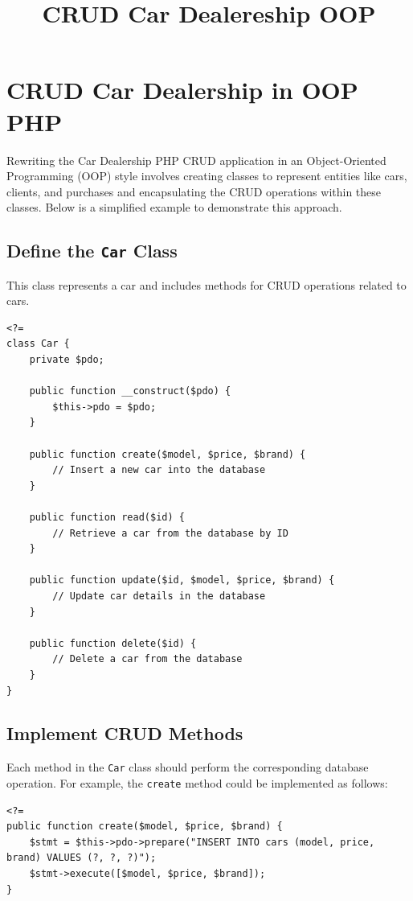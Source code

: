 \documentclass[11pt]{article}
\date{}
\title{CRUD Car Dealereship OOP}
\begin{document}
\maketitle
\setcounter{tocdepth}{3}
\tableofcontents

\setlength\parindent{10pt}

\section{CRUD Car Dealership in OOP PHP}
\label{sec:org6935730}
Rewriting the Car Dealership PHP CRUD application in an Object-Oriented
Programming (OOP) style involves creating classes to represent entities
like cars, clients, and purchases and encapsulating the CRUD operations
within these classes. Below is a simplified example to demonstrate this
approach.

\subsection{Define the \texttt{Car} Class}
\label{sec:orgaa6fa42}
This class represents a car and includes methods for CRUD operations
related to cars.

\begin{verbatim}
<?=
class Car {
    private $pdo;

    public function __construct($pdo) {
        $this->pdo = $pdo;
    }

    public function create($model, $price, $brand) {
        // Insert a new car into the database
    }

    public function read($id) {
        // Retrieve a car from the database by ID
    }

    public function update($id, $model, $price, $brand) {
        // Update car details in the database
    }

    public function delete($id) {
        // Delete a car from the database
    }
}
\end{verbatim}

\subsection{Implement CRUD Methods}
\label{sec:org3333f36}
Each method in the \texttt{Car} class should perform the corresponding database
operation. For example, the \texttt{create} method could be implemented as
follows:

\begin{verbatim}
<?=
public function create($model, $price, $brand) {
    $stmt = $this->pdo->prepare("INSERT INTO cars (model, price, brand) VALUES (?, ?, ?)");
    $stmt->execute([$model, $price, $brand]);
}
\end{verbatim}
\end{document}
